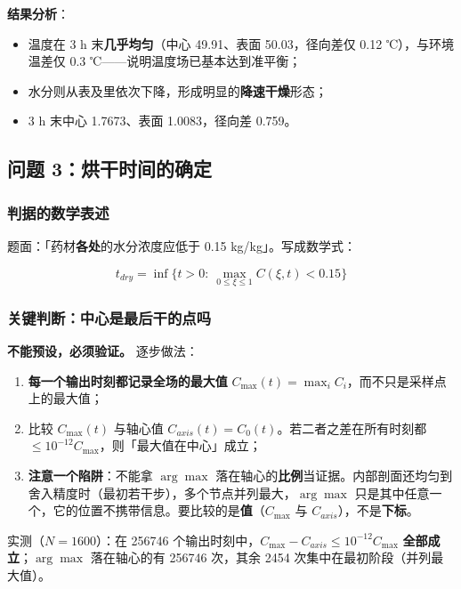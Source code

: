 \textbf{结果分析}：


\begin{itemize}
\item 温度在 3 h 末\textbf{几乎均匀}（中心 49.91、表面 50.03，径向差仅 0.12 ℃），与环境温差仅 0.3 ℃——说明温度场已基本达到准平衡；
\item 水分则从表及里依次下降，形成明显的\textbf{降速干燥}形态；
\item 3 h 末中心 1.7673、表面 1.0083，径向差 0.759。
\end{itemize}


\subsection{问题 3：烘干时间的确定}


\subsubsection{判据的数学表述}


题面：「药材\textbf{各处}的水分浓度应低于 0.15 kg/kg」。写成数学式：


\begin{equation}
t_{dry}=\inf\Big\{t>0:\ \max_{0\le\xi\le1}C(\xi,t)<0.15\Big\}\tag{10.1}
\end{equation}


\subsubsection{关键判断：中心是最后干的点吗}


\textbf{不能预设，必须验证。} 逐步做法：


\begin{enumerate}
\item \textbf{每一个输出时刻都记录全场的最大值} $C_{\max}(t)=\max_i C_i$，而不只是采样点上的最大值；
\item 比较 $C_{\max}(t)$ 与轴心值 $C_{axis}(t)=C_0(t)$。若二者之差在所有时刻都 $\le10^{-12}C_{\max}$，则「最大值在中心」成立；
\item \textbf{注意一个陷阱}：不能拿 $\arg\max$ 落在轴心的\textbf{比例}当证据。内部剖面还均匀到舍入精度时（最初若干步），多个节点并列最大，$\arg\max$ 只是其中任意一个，它的位置不携带信息。要比较的是\textbf{值}（$C_{\max}$ 与 $C_{axis}$），不是\textbf{下标}。
\end{enumerate}


实测（$N=1600$）：在 256746 个输出时刻中，$C_{\max}-C_{axis}\le10^{-12}C_{\max}$ \textbf{全部成立}；$\arg\max$ 落在轴心的有 256746 次，其余 2454 次集中在最初阶段（并列最大值）。



